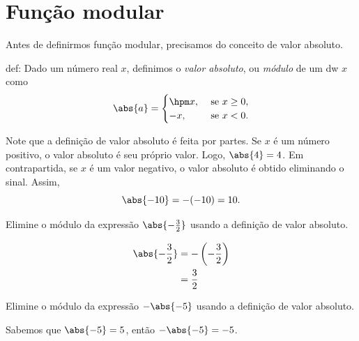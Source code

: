 \section{Função modular}

Antes de definirmos função modular, precisamos do conceito de valor absoluto.

\begin{definicao}{}{def:}
  Dado um número real $x$, definimos o
  \emph{valor absoluto},
  ou \emph{módulo} de um dw $x$ como
  \[
    \abs{a} = \begin{cases}
    \hpm x, & \text{ se } x \geq 0, \\
    -    x, & \text{ se } x <    0.
    \end{cases}
  \]
\end{definicao}

Note que a definição de valor absoluto é feita por partes. Se $x$ é um
número positivo, o valor absoluto é seu próprio valor.
Logo, $\abs{4}=4$.
Em contrapartida, se $x$ é um valor negativo, o valor absoluto é obtido
eliminando o sinal. Assim,
\[
  \abs{-10} = -(-10) = 10.
\]

\begin{example}
  Elimine o módulo da expressão
  \(
    \abs{-\frac{3}{2}}
  \)
  usando a definição de valor absoluto.

  \solution
  \begin{align*}
    \abs{-\frac{3}{2}}
    & = - \left(-\frac{3}{2} \right) \\
    & = \frac{3}{2}
  \end{align*}
\end{example}

\begin{example}
  Elimine o módulo da expressão
  \(
    -\abs{-5}
  \)
  usando a definição de valor absoluto.

  \solution
  Sabemos que $\abs{-5}=5$, então $-\abs{-5} =-5$.
\end{example}


